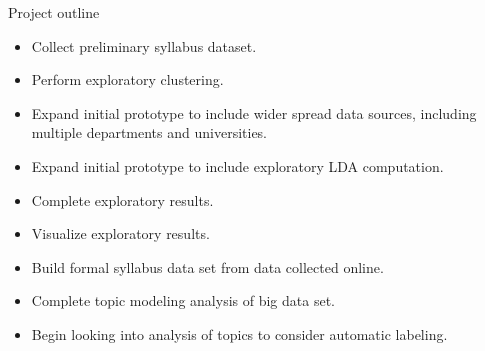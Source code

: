 \documentclass{beamer}
\begin{document}
  \begin{frame}{Project outline}
    \begin{itemize}
      \item { Collect preliminary syllabus dataset.}
      \item {\color<2>{green} Perform exploratory clustering.}
      \item { Expand initial prototype to include wider
      spread data sources, including multiple departments and
      universities.}
      \item { Expand initial prototype to include exploratory
      LDA computation.}
      \item {\color<2>{green}Complete exploratory results.}
      \item {Visualize exploratory results}.
      \item {Build formal syllabus data set from data
      collected online.}
      \item Complete topic modeling analysis of big data set.
      \item Begin looking into analysis of topics to consider automatic
      labeling.
    \end{itemize}
  \end{frame}
\end{document}
